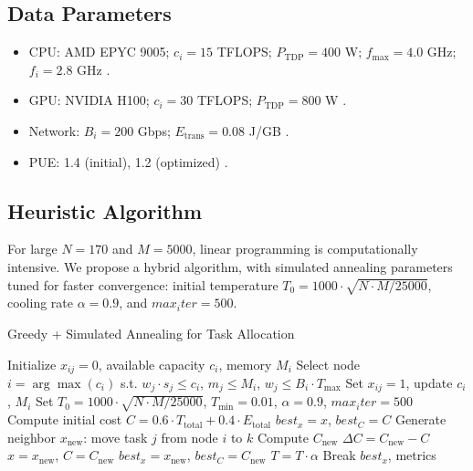 \documentclass[a4paper,11pt]{article}
\begin{document}
\subsection{Data Parameters}
\begin{itemize}\raggedright
    \item CPU: AMD EPYC 9005; $c_i = 15$ TFLOPS; $P_{\text{TDP}} = 400$ W; $f_{\text{max}} = 4.0$ GHz; $f_i = 2.8$ GHz \cite{AMD2025}.\par
    \item GPU: NVIDIA H100; $c_i = 30$ TFLOPS; $P_{\text{TDP}} = 800$ W \cite{NVIDIA2025}.\par
    \item Network: $B_i = 200$ Gbps; $E_{\text{trans}} = 0.08$ J/GB \cite{CERNNetwork2025}.\par
    \item PUE: 1.4 (initial), 1.2 (optimized) \cite{CERNDataCenter2025}.\par
\end{itemize}

\subsection{Heuristic Algorithm}
For large $N=170$ and $M=5000$, linear programming is computationally intensive. We propose a hybrid algorithm, with simulated annealing parameters tuned for faster convergence: initial temperature $T_0 = 1000 \cdot \sqrt{N \cdot M / 25000}$, cooling rate $\alpha = 0.9$, and $max_iter = 500$.

\begin{algorithm}
\caption{Greedy + Simulated Annealing for Task Allocation}
\begin{algorithmic}
\State Initialize $x_{ij} = 0$, available capacity $c_i$, memory $M_i$
    \State Select node $i = \arg\max(c_i)$ s.t. $w_j \cdot s_j \leq c_i$, $m_j \leq M_i$, $w_j \leq B_i \cdot T_{\text{max}}$
    \State Set $x_{ij} = 1$, update $c_i$, $M_i$
\EndFor
\State Set $T_0 = 1000 \cdot \sqrt{N \cdot M / 25000}$, $T_{\text{min}} = 0.01$, $\alpha = 0.9$, $max_iter = 500$
\State Compute initial cost $C = 0.6 \cdot T_{\text{total}} + 0.4 \cdot E_{\text{total}}$
\State $best_x = x$, $best_C = C$
    \State Generate neighbor $x_{\text{new}}$: move task $j$ from node $i$ to $k$
        \State Compute $C_{\text{new}}$
        \State $\Delta C = C_{\text{new}} - C$
            \State $x = x_{\text{new}}$, $C = C_{\text{new}}$
                \State $best_x = x_{\text{new}}$, $best_C = C_{\text{new}}$
            \EndIf
        \EndIf
    \EndIf
    \State $T = T \cdot \alpha$
        \State Break
    \EndIf
\EndFor
\State \Return $best_x$, metrics
\end{algorithmic}
\end{algorithm}
\end{document}
